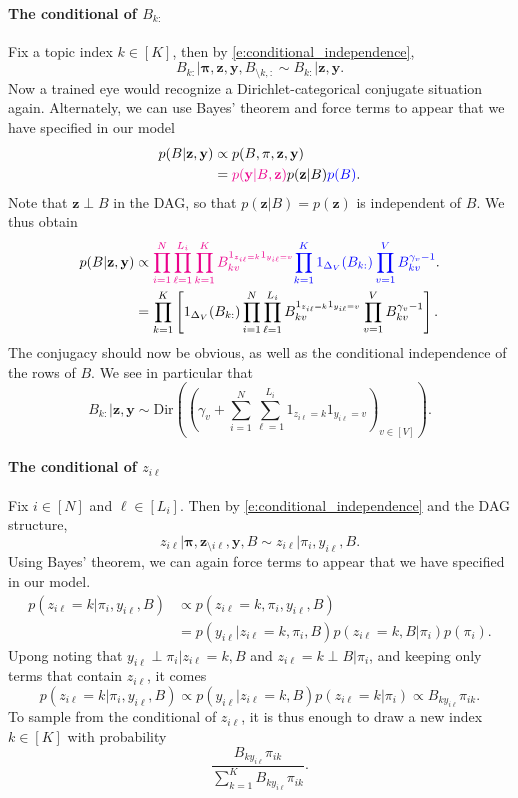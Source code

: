 \paragraph{The conditional of $B_{k:}$}
Fix a topic index $k\in[K]$, then by \eqref{e:conditional_independence},
$$
    B_{k:} \vert \mathbf{\pi}, \mathbf{z}, \mathbf{y}, B_{\setminus k,:} \sim B_{k:} \vert \mathbf{z}, \mathbf{y}.
$$
Now a trained eye would recognize a Dirichlet-categorical conjugate situation again. 
Alternately, we can use Bayes' theorem and force terms to appear that we have specified in our model
\begin{align*}
    p(B \vert \mathbf{z}, \mathbf{y}) &\propto p(B, \mathbf{\pi}, \mathbf{z}, \mathbf{y})\\
    & = \textcolor{magenta}{p(\mathbf{y} \vert B, \mathbf{z})} p(\mathbf{z}\vert B) \textcolor{blue}{p(B)}.
\end{align*}
Note that $\mathbf{z}\perp B$ in the DAG, so that $p(\mathbf{z}\vert B) = p(\mathbf{z})$ is independent of $B$.
We thus obtain
\begin{align*}
    p(B \vert \mathbf{z}, \mathbf{y})
    &\propto \textcolor{magenta}{\prod_{i=1}^N \prod_{\ell=1}^{L_i} \prod_{k=1}^K B_{kv}^{1_{z_{i\ell}=k}1_{y_{i\ell}=v}}} \textcolor{blue}{\prod_{k=1}^K 1_{\Delta_V}(B_{k:}) \prod_{v=1}^V B_{kv}^{\gamma_v-1}}.\\
    &= \prod_{k=1}^K\left[ 1_{\Delta_V}(B_{k:}) \prod_{i=1}^N \prod_{\ell=1}^{L_i} B_{kv}^{1_{z_{i\ell}=k}1_{y_{i\ell}=v}} \prod_{v=1}^V B_{kv}^{\gamma_v-1} \right].
\end{align*}
The conjugacy should now be obvious, as well as the conditional independence of the rows of $B$. 
We see in particular that
$$
    B_{k:} \vert \mathbf{z}, \mathbf{y} \sim \mathrm{Dir}\left( (\gamma_v + \sum_{i=1}^N \sum_{\ell=1}^{L_i} 1_{z_{i\ell}=k}1_{y_{i\ell}=v})_{v\in [V]} \right).
$$

\paragraph{The conditional of $z_{i\ell}$}
Fix $i\in[N]$ and $\ell\in[L_i]$. 
Then by \eqref{e:conditional_independence} and the DAG structure,
$$
    z_{i\ell} \vert \mathbf{\pi}, \mathbf{z}_{\setminus i\ell}, \mathbf{y}, B \sim z_{i\ell} \vert \pi_i, y_{i\ell}, B.
$$
Using Bayes' theorem, we can again force terms to appear that we have specified in our model.
\begin{align*}
    p(z_{i\ell} = k \vert \pi_i, y_{i\ell}, B) 
    &\propto p(z_{i\ell} = k, \pi_i, y_{i\ell}, B)\\
    &= p(y_{i\ell}\vert z_{i\ell} = k, \pi_i, B) p(z_{i\ell} = k, B\vert\pi_i) p(\pi_i).
\end{align*}
Upong noting that $y_{i\ell}\perp \pi_i\vert z_{i\ell} = k,  B$ and $z_{i\ell} = k \perp B\vert\pi_i$, and keeping only terms that contain $z_{i\ell}$, it comes 
$$
    p(z_{i\ell} = k \vert \pi_i, y_{i\ell}, B) \propto p(y_{i\ell}\vert z_{i\ell} = k, B) p(z_{i\ell} = k \vert\pi_i) \propto B_{k y_{i\ell}} \pi_{ik}.
$$
To sample from the conditional of $z_{i\ell}$, it is thus enough to draw a new index $k\in[K]$ with probability 
$$
    \frac{B_{k y_{i\ell}} \pi_{ik}}{\sum_{k=1}^K B_{k y_{i\ell}} \pi_{ik}}.
$$

